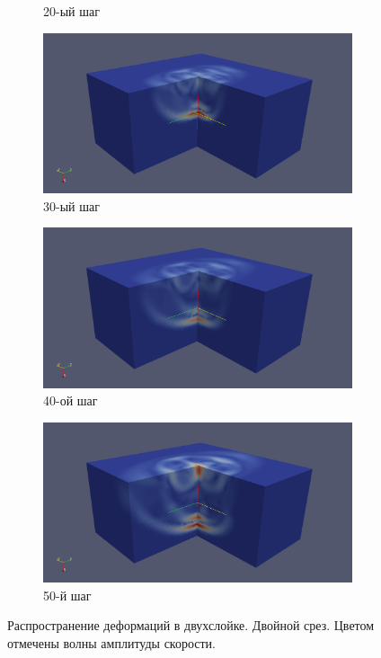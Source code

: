 \begin{figure}[H]
\begin{subfigure}[b]{0.5\textwidth}
\caption{20-ый шаг}
\end{subfigure}
\begin{subfigure}[b]{0.5\textwidth}
\centering
\includegraphics[width=1.0\textwidth]{png/two-layers/clip2_30.png}
\caption{30-ый шаг}
\end{subfigure}
\begin{subfigure}[b]{0.5\textwidth}
\centering
\includegraphics[width=1.0\textwidth]{png/two-layers/clip2_40.png}
\caption{40-ой шаг}
\end{subfigure}
\begin{subfigure}[b]{0.5\textwidth}
\centering
\includegraphics[width=1.0\textwidth]{png/two-layers/clip2_50.png}
\caption{50-й шаг}
\end{subfigure}
\caption{Распространение деформаций в двухслойке. Двойной срез. Цветом отмечены волны амплитуды скорости.}
\label{pic:two_layers_clip2}
\end{figure}

